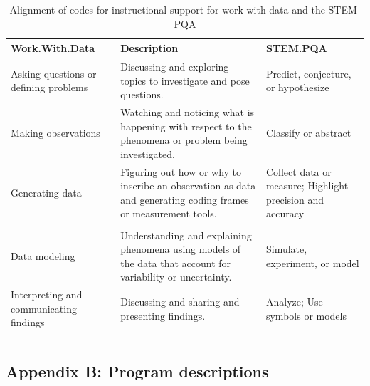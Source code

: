 \documentclass[]{book}
\theoremstyle{definition}
\theoremstyle{definition}
\theoremstyle{definition}
\theoremstyle{remark}
\begin{document}
\begin{landscape}\begin{table}

\caption{\label{tab:unnamed-chunk-14}Alignment of codes for instructional support for work with data and the STEM-PQA}
\centering
\begin{tabular}[t]{lll}
\toprule
Work.With.Data & Description & STEM.PQA\\
\midrule
Asking questions or defining problems & Discussing and exploring topics to investigate and pose questions. & Predict, conjecture, or hypothesize\\
Making observations & Watching and noticing what is happening with respect to the phenomena or problem being investigated. & Classify or abstract\\
Generating data & Figuring out how or why to inscribe an observation as data and generating coding frames or measurement tools. & Collect data or measure; Highlight precision and accuracy\\
 &  & \\
Data modeling & Understanding and explaining phenomena using models of the data that account for variability or uncertainty. & Simulate, experiment, or model\\
Interpreting and communicating findings & Discussing and sharing and presenting findings. & Analyze; Use symbols or models\\
 &  & \\
 &  & \\
\bottomrule
\end{tabular}
\end{table}
\end{landscape}

\subsection{Appendix B: Program
descriptions}\label{appendix-b-program-descriptions}
\end{document}
